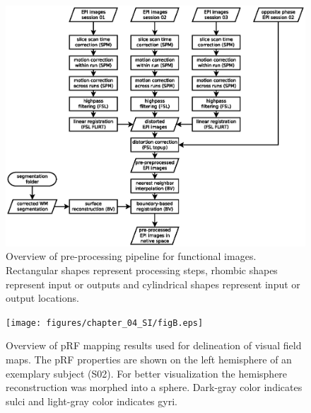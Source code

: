 \begin{figure}[htbp!]
\centering
\includegraphics[width=\textwidth]{figures/chapter_04_SI/figA.eps}
\caption{Overview of pre-processing pipeline for functional images. Rectangular shapes represent processing steps, rhombic shapes represent input or outputs and cylindrical shapes represent input or output locations.}
\label{fig:funcAnalOv}
\end{figure}

\begin{figure}[htbp!]
\centering
\texttt{[image: figures/chapter\_04\_SI/figB.eps]}
\caption{Overview of pRF mapping results used for delineation of visual field maps. The pRF properties are shown on the left hemisphere of an exemplary subject (S02). For better visualization the hemisphere reconstruction was morphed into a sphere. Dark-gray color indicates sulci and light-gray color indicates gyri.}
\label{fig:surfaceRes}
\end{figure}

